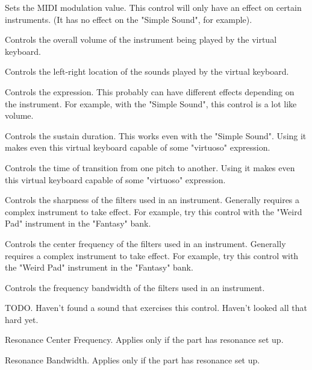    \setcounter{ItemCounter}{0}      %

   Sets the MIDI modulation value.  This control will
   only have an effect on certain instruments.  (It has no effect on the
   "Simple Sound", for example).

   Controls the overall volume of the instrument being played by the virtual
   keyboard.

   Controls the left-right location of the sounds played by the virtual
   keyboard.

   Controls the expression.  This probably can have different effects depending
   on the instrument.  For example, with the "Simple Sound", this control is a
   lot like volume.

   Controls the sustain duration.  This works even with the "Simple Sound".
   Using it makes even this virtual keyboard capable of some "virtuoso"
   expression.

   Controls the time of transition from one pitch to another.
   Using it makes even this virtual keyboard capable of some "virtuoso"
   expression.

   Controls the sharpness of the filters used in an instrument.
   Generally requires a complex instrument to take effect.
   For example, try this control with the "Weird Pad" instrument in the
   "Fantasy" bank.

   Controls the center frequency of the filters used in an instrument.
   Generally requires a complex instrument to take effect.
   For example, try this control with the "Weird Pad" instrument in the
   "Fantasy" bank.

   Controls the frequency bandwidth of the filters used in an instrument.

   TODO.
   Haven't found a sound that exercises this control.
   Haven't looked all that hard yet.

   Resonance Center Frequency.
   Applies only if the part has resonance set up.

   Resonance Bandwidth.
   Applies only if the part has resonance set up.

